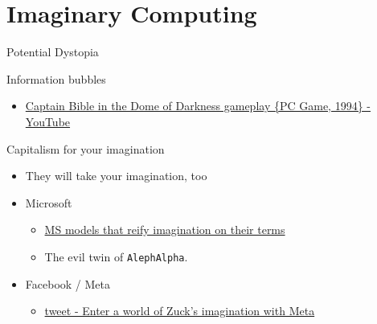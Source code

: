 \documentclass[presentation]{beamer}
\begin{document}
\section{Imaginary Computing}
\label{sec:orgef325e5}
\begin{frame}[label={sec:org1874476},fragile]{Potential Dystopia}
 \begin{block}{Information bubbles}
\begin{itemize}
\item \href{https://www.youtube.com/watch?v=Ut7JlPeGNyM}{Captain Bible in the Dome of Darkness gameplay \{PC Game, 1994\} - YouTube}
\end{itemize}
\end{block}

\begin{block}{Capitalism for your imagination}
\begin{itemize}
\item They will take your imagination, too
\item Microsoft
\begin{itemize}
\item \href{https://www.marktechpost.com/2021/11/06/microsoft-ai-introduces-turing-bletchley-a-2-5-billion-parameter-universal-image-language-representation-model-t-uilr/}{MS models that reify imagination on their terms}
\item The evil twin of \texttt{AlephAlpha}.
\end{itemize}
\item Facebook / Meta
\begin{itemize}
\item \href{https://twitter.com/Meta/status/1456269728687689738?ref\_src=twsrc\%5Egoogle\%7Ctwcamp\%5Eserp\%7Ctwgr\%5Etweet}{tweet - Enter a world of Zuck's imagination with Meta}
\end{itemize}
\end{itemize}
\end{block}
\end{frame}
\end{document}
